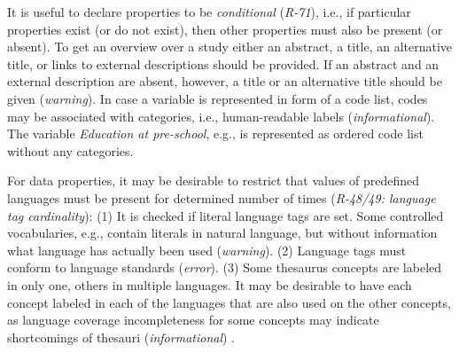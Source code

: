 \documentclass[conference]{IEEEtran}
\newenvironment{DL}{
  \small
  \vspace{0cm}
	\begin{center}
  \begin{tabular}{c l}

}{
  \end{tabular}
	\end{center}
}
\begin{document}
It is useful to declare properties to be \emph{conditional} (\emph{R-71}), i.e., if particular properties exist (or do not exist), then other properties must also be present (or absent).
To get an overview over a study either an abstract, a title, an alternative title, or links to external descriptions should be provided. 
If an abstract and an external description are absent, however,  
a title or an alternative title should be given (\emph{warning}).
In case a variable is represented in form of a code list, codes may be associated with categories, i.e., human-readable labels (\emph{informational}).
The variable \emph{Education at pre-school}, e.g., is represented as ordered code list without any categories.

For data properties, it may be desirable to restrict that values of predefined languages must be present for determined number of times (\emph{R-48/49: language tag cardinality}):
(1) It is checked if literal language tags are set. Some controlled vocabularies, e.g., contain literals in natural language, but without information what language has actually been used (\emph{warning}). 
(2) Language tags must conform to language standards (\emph{error}). 
(3) Some thesaurus concepts are labeled in only one, others in multiple languages. 
It may be desirable to have each concept labeled in each of the languages that are also used on the other concepts,
as language coverage incompleteness for some concepts may indicate shortcomings of thesauri (\emph{informational})
\cite{MaderHaslhoferIsaac2012}.



\end{document}
